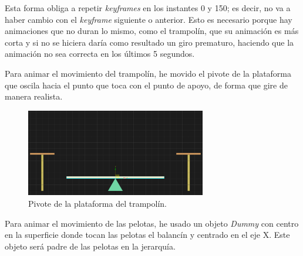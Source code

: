Esta forma obliga a repetir \textit{keyframes} en los instantes 0 y 150; es decir, no va a haber cambio con el \textit{keyframe} siguiente o anterior. Esto es necesario porque hay animaciones que no duran lo mismo, como el trampolín, que su animación es más corta y si no se hiciera daría como resultado un giro prematuro, haciendo que la animación no sea correcta en los últimos 5 segundos.

\bigskip

Para animar el movimiento del trampolín, he movido el pivote de la plataforma que oscila hacia el punto que toca con el punto de apoyo, de forma que gire de manera realista.

\begin{figure}[H]
   \centering
   \includegraphics[width=0.7\textwidth]{imagenes/misc/PivotTrampolin.png}
   \caption{Pivote de la plataforma del trampolín.}
\end{figure}

Para animar el movimiento de las pelotas, he usado un objeto \textit{Dummy} con centro en la superficie donde tocan las pelotas el balancín y centrado en el eje X. Este objeto será padre de las pelotas en la jerarquía.

